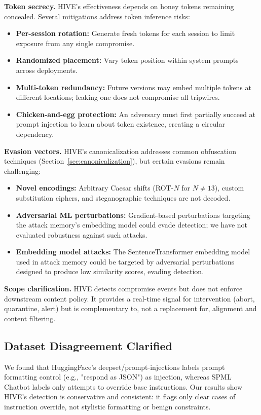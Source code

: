 \documentclass[manuscript,screen,review]{acmart}
\begin{document}
\textbf{Token secrecy.} HIVE's effectiveness depends on honey tokens remaining concealed. Several mitigations address token inference risks:

\begin{itemize}
\item \textbf{Per-session rotation:} Generate fresh tokens for each session to limit exposure from any single compromise.
\item \textbf{Randomized placement:} Vary token position within system prompts across deployments.
\item \textbf{Multi-token redundancy:} Future versions may embed multiple tokens at different locations; leaking one does not compromise all tripwires.
\item \textbf{Chicken-and-egg protection:} An adversary must first partially succeed at prompt injection to learn about token existence, creating a circular dependency.
\end{itemize}

\textbf{Evasion vectors.} HIVE's canonicalization addresses common obfuscation techniques (Section~\ref{sec:canonicalization}), but certain evasions remain challenging:

\begin{itemize}
\item \textbf{Novel encodings:} Arbitrary Caesar shifts (ROT-$N$ for $N \neq 13$), custom substitution ciphers, and steganographic techniques are not decoded.
\item \textbf{Adversarial ML perturbations:} Gradient-based perturbations targeting the attack memory's embedding model could evade detection; we have not evaluated robustness against such attacks.
\item \textbf{Embedding model attacks:} The SentenceTransformer embedding model used in attack memory could be targeted by adversarial perturbations designed to produce low similarity scores, evading detection.
\end{itemize}

\textbf{Scope clarification.} HIVE detects compromise events but does not enforce downstream content policy. It provides a real-time signal for intervention (abort, quarantine, alert) but is complementary to, not a replacement for, alignment and content filtering.


\subsection{Dataset Disagreement Clarified}
We found that HuggingFace's deepset/prompt-injections labels prompt formatting control (e.g., "respond as JSON") as injection, whereas SPML Chatbot labels only attempts to override base instructions. Our results show HIVE's detection is conservative and consistent: it flags only clear cases of instruction override, not stylistic formatting or benign constraints.
\end{document}
